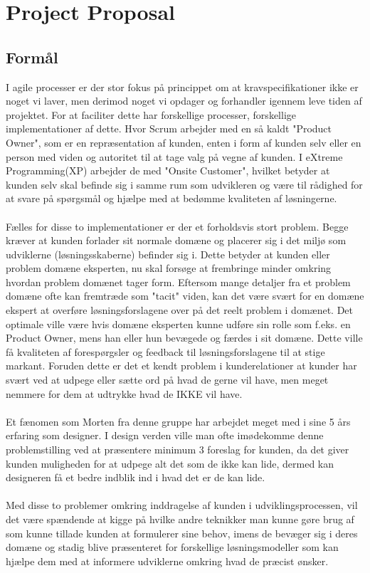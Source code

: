 \section{Project Proposal}
\subsection{Formål}
I agile processer er der stor fokus på princippet om at kravspecifikationer ikke er noget vi laver, men derimod noget vi opdager og forhandler igennem leve tiden af projektet.
For at faciliter dette har forskellige processer, forskellige implementationer af dette.
Hvor Scrum arbejder med en så kaldt "Product Owner", som er en repræsentation af kunden, enten i form af kunden selv eller en person med viden og autoritet til at tage valg på vegne af kunden.
I eXtreme Programming(XP) arbejder de med "Onsite Customer", hvilket betyder at kunden selv skal befinde sig i samme rum som udvikleren og være til rådighed for at svare på spørgsmål og hjælpe med at bedømme kvaliteten af løsningerne.
\\\\
Fælles for disse to implementationer er der et forholdsvis stort problem. Begge kræver at kunden forlader sit normale domæne og placerer sig i det miljø som udviklerne (løsningsskaberne) befinder sig i.
Dette betyder at kunden eller problem domæne eksperten, nu skal forsøge at frembringe minder omkring hvordan problem domænet tager form.
Eftersom mange detaljer fra et problem domæne ofte kan fremtræde som "tacit" viden, kan det være svært for en domæne ekspert at overføre løsningsforslagene over på det reelt problem i domænet.
Det optimale ville være hvis domæne eksperten kunne udføre sin rolle som f.eks. en Product Owner, mens han eller hun bevægede og færdes i sit domæne.
Dette ville få kvaliteten af forespørgsler og feedback til løsningsforslagene til at stige markant.
Foruden dette er det et kendt problem i kunderelationer at kunder har svært ved at udpege eller sætte ord på hvad de gerne vil have, men meget nemmere for dem at udtrykke hvad de IKKE vil have.
\\\\
Et fænomen som Morten fra denne gruppe har arbejdet meget med i sine 5 års erfaring som designer.
I design verden ville man ofte imødekomme denne problemstilling ved at præsentere minimum 3 foreslag for kunden, da det giver kunden muligheden for at udpege alt det som de ikke kan lide, dermed kan designeren få et bedre indblik ind i hvad det er de kan lide.
\\\\
Med disse to problemer omkring inddragelse af kunden i udviklingsprocessen, vil det være spændende at kigge på hvilke andre teknikker man kunne gøre brug af som kunne tillade kunden at formulerer sine behov, imens de bevæger sig i deres domæne og stadig blive præsenteret for forskellige løsningsmodeller som kan hjælpe dem med at informere udviklerne omkring hvad de præcist ønsker.

